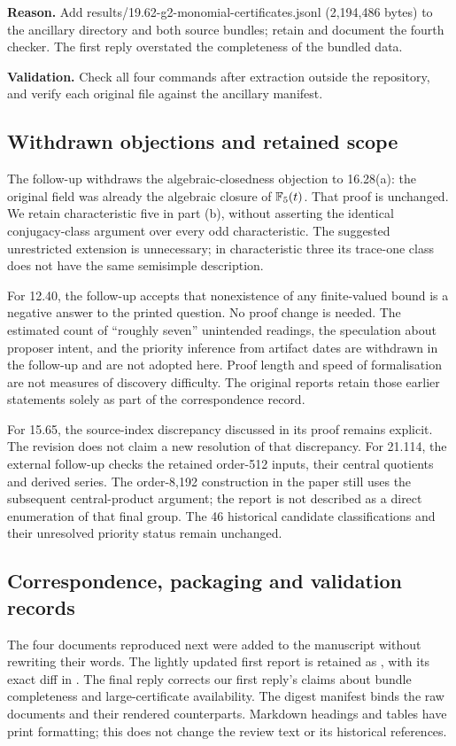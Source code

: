\noindent\textbf{Reason.} Add results/19.62-g2-monomial-certificates.jsonl (2,194,486 bytes) to the ancillary directory and both source bundles; retain and document the fourth checker. The first reply overstated the completeness of the bundled data.

\noindent\textbf{Validation.} Check all four commands after extraction outside the repository, and verify each original file against the ancillary manifest.


\subsection{Withdrawn objections and retained scope}
The follow-up withdraws the algebraic-closedness objection to 16.28(a):
the original field was already the algebraic closure of \(\mathbb F_5(t)\).
That proof is unchanged. We retain characteristic five in part (b),
without asserting the identical conjugacy-class argument over every odd
characteristic. The suggested unrestricted extension is unnecessary;
in characteristic three its trace-one class does not have the same
semisimple description.

For 12.40, the follow-up accepts that nonexistence of any finite-valued
bound is a negative answer to the printed question. No proof change is
needed. The estimated count of ``roughly seven'' unintended readings,
the speculation about proposer intent, and the priority inference from
artifact dates are withdrawn in the follow-up and are not adopted here.
Proof length and speed of formalisation are not measures of discovery
difficulty. The original reports retain those earlier statements solely
as part of the correspondence record.

For 15.65, the source-index discrepancy discussed in its proof remains
explicit. The revision does not claim a new resolution of that discrepancy.
For 21.114, the external follow-up checks the retained order-512 inputs,
their central quotients and derived series. The order-8,192 construction
in the paper still uses the subsequent central-product argument; the
report is not described as a direct enumeration of that final group.
The 46 historical candidate classifications and their unresolved priority
status remain unchanged.

\subsection{Correspondence, packaging and validation records}
The four documents reproduced next were added to the manuscript without
rewriting their words. The lightly updated first report is retained as
, with its exact diff in
. The final reply corrects
our first reply's claims about bundle completeness and large-certificate
availability. The digest manifest binds the raw documents and their
rendered counterparts. Markdown headings and tables have print formatting;
this does not change the review text or its historical references.


